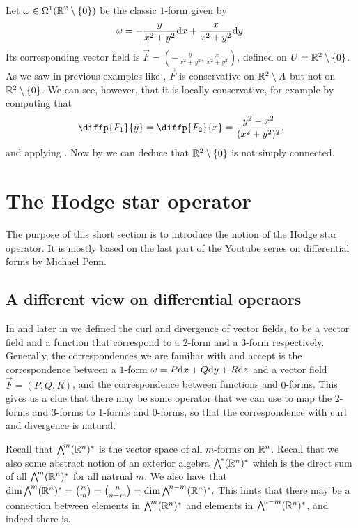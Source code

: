 \documentclass[11pt,a4paper]{article}
\begin{document}
\begin{example}
  Let $\omega \in \Omega^1(\mathbb{R}^2 \setminus \left\{0\right\})$ be the classic
  $1$-form given by
  \[
    \omega = - \frac{y}{x^2 + y^2} \dx + \frac{x}{x^2 + y^2} \dy.
  \]
  Its corresponding vector field is
  $\vec F = (- \frac{y}{x^2 + y^2},\frac{x}{x^2 + y^2})$,
  defined on $U = \mathbb{R}^2 \setminus \left\{0\right\}$.
  As we saw in previous examples like ,
  $\vec F$ is conservative on $\mathbb{R}^2 \setminus A$
  but not on $\mathbb{R}^2 \setminus \left\{0\right\}$.
  We can see, however, that it is locally conservative,
  for example by computing that
  \[
    \diffp{{F_1}}{y} =
    \diffp{{F_2}}{x} =
    \frac{y^2 - x^2}{(x^2 + y^2)^2},
  \]
  and applying .
  Now by 
  we can deduce that $\mathbb{R}^2 \setminus \left\{0\right\}$ is not simply connected.
\end{example}

\newpage


\section{The Hodge star operator}
The purpose of this short section is to introduce the notion of
the Hodge star operator.
It is mostly based on the
last part of the Youtube series on differential forms by Michael Penn.

\subsection{A different view on differential operaors}
\begin{remark}
  In  and later in 
  we defined the curl and divergence of vector fields,
  to be a vector field and a function
  that correspond to a $2$-form and a $3$-form respectively.
  Generally, the correspondences we are familiar with and accept
  is the correspondence between a $1$-form $\omega = P \dx + Q \dy + R \dz$
  and a vector field $\vec F = (P,Q,R)$,
  and the correspondence between functions and $0$-forms.
  This gives us a clue that there may be some operator that we can use
  to map the $2$-forms and $3$-forms to $1$-forms and $0$-forms,
  so that the correspondence with curl and divergence is natural.
\end{remark}

\begin{remark}
  Recall that $\bigwedge^{\!m}(\mathbb{R}^n)^*$ is the vector space of all $m$-forms
  on $\mathbb{R}^n$.
  Recall that we also some abstract notion of
  an exterior algebra $\bigwedge^{\!*}(\mathbb{R}^n)^*$ which is the direct sum of all
  $\bigwedge^{\!m}(\mathbb{R}^n)^*$ for all natrual $m$.
  We also have that
  $
    \dim \bigwedge^{\!m}(\mathbb{R}^n)^* =
    \binom{n}{m} =
    \binom{n}{n - m} =
    \dim \bigwedge^{\!n-m}(\mathbb{R}^n)^*.
  $
  This hints that there may be a connection between 
  elements in $\bigwedge^{\!m}(\mathbb{R}^n)^*$ and elements in
  $\bigwedge^{\!n-m}(\mathbb{R}^n)^*$,
  and indeed there is.
\end{remark}
\end{document}
